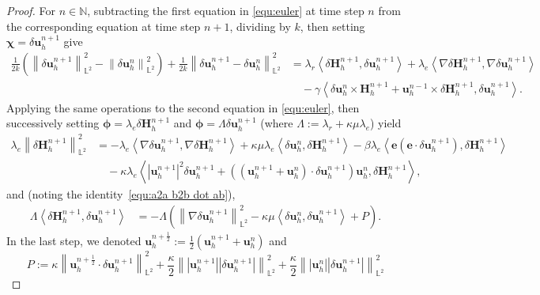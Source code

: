 \documentclass[11pt, reqno]{amsart}
\theoremstyle{definition}
\theoremstyle{remark}
\numberwithin{equation}{section}
\newcommand{\bff}{\boldsymbol}
\newcommand{\bb}{\mathbb}
\newcommand{\norm}[2]{\left\|{#1}\right\|_{#2}}
\newcommand{\inpro}[2]{\left\langle#1,#2\right\rangle}
\newcommand{\abs}[1]{\left|{#1}\right|}
\begin{document}
\begin{proof}
For $n\in \bb{N}$, subtracting the first equation in \eqref{equ:euler} at time step $n$ from the corresponding equation at time step $n+1$, dividing by $k$, then setting $\bff{\chi}=\delta\bff{u}_h^{n+1}$ give
\begin{align}\label{equ:delta uh n1}
	\nonumber
	\frac{1}{2k} \left(\norm{\delta \bff{u}_h^{n+1}}{\bb{L}^2}^2 - \norm{\delta \bff{u}_h^n}{\bb{L}^2}^2\right)
	+
	\frac{1}{2k} \norm{\delta \bff{u}_h^{n+1}-\delta \bff{u}_h^n}{\bb{L}^2}^2
	&=
	\lambda_r \inpro{\delta \bff{H}_h^{n+1}}{\delta \bff{u}_h^{n+1}}
	+
	\lambda_e \inpro{\nabla \delta \bff{H}_h^{n+1}}{\nabla \delta \bff{u}_h^{n+1}}
	\\
	&\quad
	-
	\gamma \inpro{\delta \bff{u}_h^n\times \bff{H}_h^{n+1} + \bff{u}_h^{n-1} \times \delta \bff{H}_h^{n+1}}{\delta \bff{u}_h^{n+1}}.
\end{align}
Applying the same operations to the second equation in \eqref{equ:euler}, then successively setting $\bff{\phi}=\lambda_e \delta \bff{H}_h^{n+1}$ and $\bff{\phi}=\Lambda \delta \bff{u}_h^{n+1}$ (where $\Lambda:= \lambda_r+\kappa \mu \lambda_e$) yield
\begin{align}
	\label{equ:lambda e delta Hh n1}
	\nonumber
	\lambda_e \norm{\delta \bff{H}_h^{n+1}}{\bb{L}^2}^2
	&=
	-
	\lambda_e \inpro{\nabla \delta \bff{u}_h^{n+1}}{\nabla \delta \bff{H}_h^{n+1}}
	+
	\kappa \mu \lambda_e \inpro{\delta\bff{u}_h^n}{\delta \bff{H}_h^{n+1}}
	-
	\beta\lambda_e \inpro{\bff{e}(\bff{e}\cdot \delta\bff{u}_h^{n+1})}{\delta\bff{H}_h^{n+1}}
	\\
	&\quad
	-
	\kappa \lambda_e \inpro{\abs{\bff{u}_h^{n+1}}^2 \delta \bff{u}_h^{n+1} + \left( (\bff{u}_h^{n+1}+\bff{u}_h^n)\cdot \delta \bff{u}_h^{n+1}\right) \bff{u}_h^n}{\delta \bff{H}_h^{n+1}},
\end{align}
and (noting the identity~\eqref{equ:a2a b2b dot ab}),
\begin{align}
	\label{equ:delta Hh delta uh}
	\Lambda \inpro{\delta \bff{H}_h^{n+1}}{\delta \bff{u}_h^{n+1}}
	&=
	-\Lambda\left(\norm{\nabla \delta \bff{u}_h^{n+1}}{\bb{L}^2}^2 - \kappa \mu \inpro{\delta \bff{u}_h^n}{\delta \bff{u}_h^{n+1}}
	+ P \right).
\end{align}
In the last step, we denoted $\bff{u}_h^{n+\frac{1}{2}}:= \frac{1}{2} (\bff{u}_h^{n+1}+\bff{u}_h^n)$ and
\[
P:= \kappa \norm{\bff{u}_h^{n+\frac{1}{2}}\cdot \delta \bff{u}_h^{n+1}}{\bb{L}^2}^2
+ \frac{\kappa}{2} \norm{\abs{\bff{u}_h^{n+1}} \abs{\delta \bff{u}_h^{n+1}}}{\bb{L}^2}^2
+ \frac{\kappa}{2} \norm{\abs{\bff{u}_h^n} \abs{\delta \bff{u}_h^{n+1}}}{\bb{L}^2}^2
\]
\end{proof}
\end{document}
